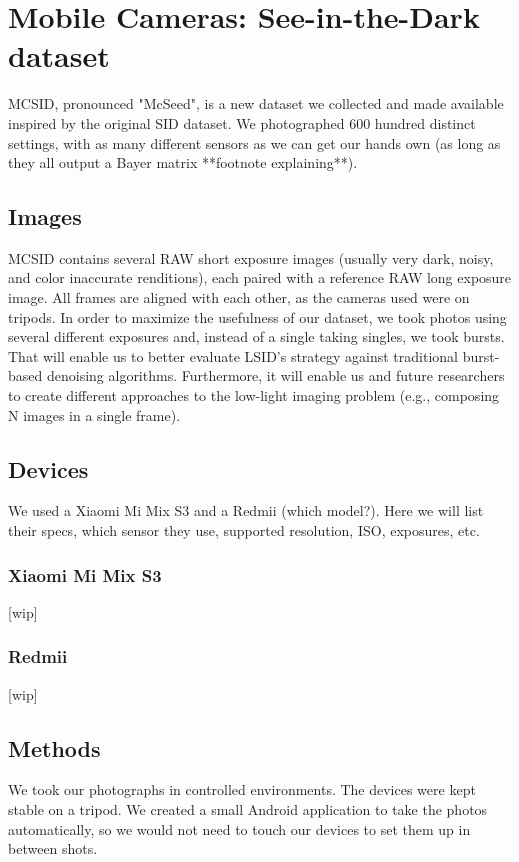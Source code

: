 \chapter{Mobile Cameras: See-in-the-Dark dataset}
MCSID, pronounced "McSeed", is a new dataset we collected and made available inspired by the original SID dataset.
We photographed 600 hundred distinct settings, with as many different sensors as we can get our hands own (as long as they all output a Bayer matrix **footnote explaining**).

\section{Images}
MCSID contains several RAW short exposure images (usually very dark, noisy, and color inaccurate renditions), each paired with a reference RAW long exposure image.
All frames are aligned with each other, as the cameras used were on tripods.
In order to maximize the usefulness of our dataset, we took photos using several different exposures and, instead of a single taking singles, we took bursts.
That will enable us to better evaluate LSID's strategy against traditional burst-based denoising algorithms.
Furthermore, it will enable us and future researchers to create different approaches to the low-light imaging problem (e.g., composing N images in a single frame).

\section{Devices}
We used a Xiaomi Mi Mix S3 and a Redmii (which model?).
Here we will list their specs, which sensor they use, supported resolution, ISO, exposures, etc.

\subsection{Xiaomi Mi Mix S3}
[wip]

\subsection{Redmii}
[wip]

\section{Methods}
We took our photographs in controlled environments.
The devices were kept stable on a tripod.
We created a small Android application to take the photos automatically, so we would not need to touch our devices to set them up in between shots.


